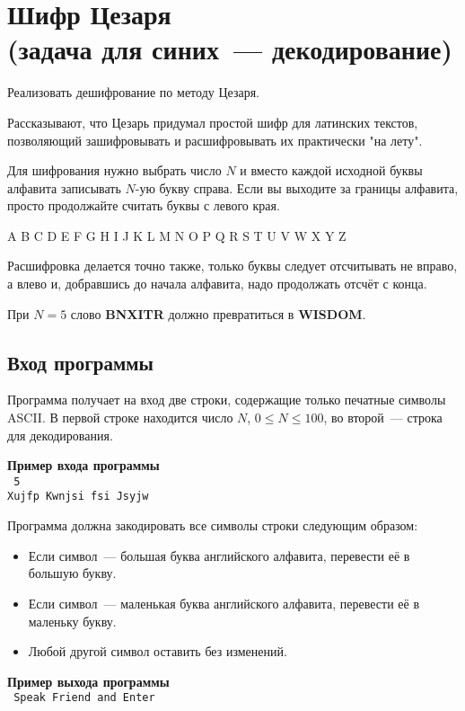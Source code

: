 \documentclass[a4paper,10pt]{article}
\begin{document}
\section*{Шифр Цезаря\\
(задача для синих~--- декодирование)}

Реализовать дешифрование по методу Цезаря.

Рассказывают, что Цезарь придумал простой шифр для латинских текстов, позволяющий зашифровывать и расшифровывать их практически "на лету".

Для шифрования нужно выбрать число $N$ и вместо каждой исходной буквы алфавита записывать $N$-ую букву справа.
Если вы выходите за границы алфавита, просто продолжайте считать буквы с левого края.

\begin{center}
A B C D E F G H I J K L M N O P Q R S T U V W X Y Z
\end{center}

Расшифровка делается точно также, только буквы следует отсчитывать не вправо, а влево и, добравшись до начала алфавита, надо продолжать отсчёт с конца.

При $N = 5$ слово \textbf{BNXITR} должно превратиться в \textbf{WISDOM}.

\subsection*{Вход программы}

Программа получает на вход две строки, содержащие только печатные символы ASCII.
В первой строке находится число $N$, $0 \leq N \leq 100$, во второй~--- строка для декодирования.

\noindent\textbf{Пример входа программы}\\
\texttt{
5\\
Xujfp Kwnjsi fsi Jsyjw
}

Программа должна закодировать все символы строки следующим образом:

\begin{itemize}
    \item Если символ~--- большая буква английского алфавита, перевести её в большую букву.
    \item Если символ~--- маленькая буква английского алфавита, перевести её в маленьку букву.
    \item Любой другой символ оставить без изменений.
\end{itemize}

\noindent\textbf{Пример выхода программы}\\
\texttt{
Speak Friend and Enter
}
\end{document}
